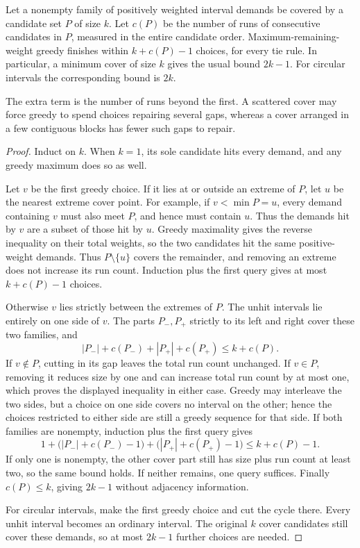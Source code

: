 \begin{lemma}
\label{lem:greedy-cover-length}
Let a nonempty family of positively weighted interval demands
be covered by a candidate set $P$ of size $k$. Let $c(P)$ be the
number of runs of consecutive candidates in $P$, measured in the
entire candidate order. Maximum-remaining-weight greedy finishes
within $k+c(P)-1$ choices, for every tie rule.
In particular, a minimum cover of size $k$ gives the usual bound
$2k-1$. For circular intervals the corresponding bound is $2k$.
\end{lemma}
\noindent
The extra term is the number of runs beyond the first. A scattered
cover may force greedy to spend choices repairing several gaps,
whereas a cover arranged in a few contiguous blocks has fewer such
gaps to repair.
\begin{proof}
Induct on $k$. When $k=1$, its sole candidate hits every demand,
and any greedy maximum does so as well.

Let $v$ be the first greedy choice. If it lies at or outside an
extreme of $P$, let $u$ be the nearest extreme cover point.
For example, if $v<\min P=u$, every demand containing $v$ must also
meet $P$, and hence must contain $u$. Thus the demands hit by $v$
are a subset of those hit by $u$. Greedy maximality gives the reverse
inequality on their total weights, so the two candidates hit the
same positive-weight demands.
Thus $P\setminus\{u\}$ covers the remainder, and removing an
extreme does not increase its run count. Induction plus the first
query gives at most $k+c(P)-1$ choices.

Otherwise $v$ lies strictly between the extremes of $P$.
The unhit intervals lie entirely on one side of $v$.
The parts $P_-,P_+$ strictly to its left and right cover these
two families, and
\[
 |P_-|+c(P_-)+|P_+|+c(P_+)\le k+c(P).
\]
If $v\notin P$, cutting in its gap leaves the total run count
unchanged. If $v\in P$, removing it reduces size by one and can
increase total run count by at most one, which proves the displayed
inequality in either case. Greedy may interleave the two sides, but
a choice on one side covers no interval on the other; hence the
choices restricted to either side are still a greedy sequence for
that side. If both families are nonempty,
induction plus the first query gives
\[
 1+\bigl(|P_-|+c(P_-)-1\bigr)
   +\bigl(|P_+|+c(P_+)-1\bigr)\le k+c(P)-1.
\]
If only one is nonempty, the other cover part still has size plus
run count at least two, so the same bound holds. If neither
remains, one query suffices.
Finally $c(P)\le k$, giving $2k-1$ without adjacency information.

For circular intervals, make the first greedy choice and cut the
cycle there. Every unhit interval becomes an ordinary interval.
The original $k$ cover candidates still cover these demands,
so at most $2k-1$ further choices are needed.
\end{proof}

